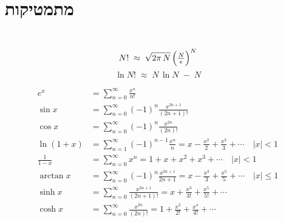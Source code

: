 \section{מתמטיקות}
\begin{cheatformula}\\
    $$N! \;\approx\; \sqrt{2\pi\,N}\,\Bigl(\tfrac{N}{e}\Bigr)^{N}$$
    $$\ln N! \;\approx\; N\,\ln N \;-\; N$$
\end{cheatformula}



\begin{cheatformula}
\begin{align*}
e^x &= \sum_{n=0}^{\infty} \frac{x^n}{n!} \\[6pt]
\sin x &= \sum_{n=0}^{\infty} (-1)^n \frac{x^{2n+1}}{(2n+1)!} \\[6pt]
\cos x &= \sum_{n=0}^{\infty} (-1)^n \frac{x^{2n}}{(2n)!} \\[6pt]
\ln(1 + x) &= \sum_{n=1}^{\infty} (-1)^{n-1} \frac{x^n}{n}
= x - \frac{x^2}{2} + \frac{x^3}{3} + \cdots
\quad  |x| < 1 \\[6pt]
\frac{1}{1 - x} &= \sum_{n=0}^{\infty} x^n 
= 1 + x + x^2 + x^3 + \cdots
\quad |x| < 1 \\[6pt]
\arctan x &= \sum_{n=0}^{\infty} (-1)^n \frac{x^{2n+1}}{2n+1}
= x - \frac{x^3}{3} + \frac{x^5}{5} + \cdots
\quad |x| \le 1 \\[6pt]
\sinh x &= \sum_{n=0}^{\infty} \frac{x^{2n+1}}{(2n+1)!}
= x + \frac{x^3}{3!} + \frac{x^5}{5!} + \cdots \\[6pt]
\cosh x &= \sum_{n=0}^{\infty} \frac{x^{2n}}{(2n)!}
= 1 + \frac{x^2}{2!} + \frac{x^4}{4!} + \cdots
\end{align*}

\end{cheatformula}

